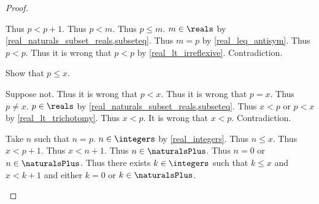 \begin{proof}
\begin{byCase}
\begin{subproof}
            Thus $p < p + 1$.
            Thus $p < m$.
            Thus $p \leq m$.
            $m\in\reals$ by \cref{real_naturals_subset_reals,subseteq}.
            Thus $m = p$ by \cref{real_leq_antisym}.
            Thus $p < p$.
            Thus it is wrong that $p < p$ by \cref{real_lt_irreflexive}.
            Contradiction.
        \end{subproof}
        Show that $p \leq x$.
        \begin{subproof}
            Suppose not.
            Thus it is wrong that $p < x$.
            Thus it is wrong that $p = x$.
            Thus $p \neq x$.
            $p\in\reals$ by \cref{real_naturals_subset_reals,subseteq}.
            Thus $x < p$ or $p < x$ by \cref{real_lt_trichotomy}.
            Thus $x < p$.
            It is wrong that $x < p$.
            Contradiction.
        \end{subproof}
        Take $n$ such that $n = p$.
        $n\in\integers$ by \cref{real_integers}.
        Thus $n \leq x$.
        Thus $x < p + 1$.
        Thus $x < n + 1$.
        Thus $n\in\naturalsPlus$.
        Thus $n = 0$ or $n\in\naturalsPlus$.
        Thus there exists $k\in\integers$ such that $k \leq x$ and $x < k + 1$ and either $k = 0$ or $k\in\naturalsPlus$.
    \end{byCase}
\end{proof}

